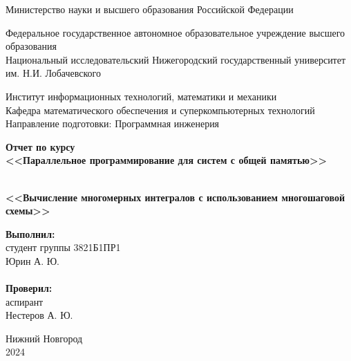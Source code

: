 \documentclass{report}
\begin{document}
\begin{titlepage}

\begin{center}
Министерство науки и высшего образования Российской Федерации
\end{center}

\begin{center}
Федеральное государственное автономное образовательное учреждение высшего образования \\
Национальный исследовательский Нижегородский государственный университет \newline им. Н.И. Лобачевского
\end{center}

\begin{center}
Институт информационных технологий, математики и механики \\
Кафедра математического обеспечения и суперкомпьютерных технологий \\
Направление подготовки: Программная инженерия
\end{center}

\begin{center}
\textbf{Отчет по курсу \\
\vspace{0.5em}
<<Параллельное программирование для систем с общей памятью>>} \\
\end{center}

\vspace{4em}

\begin{center}
\textbf{ \\
\vspace{0.5em}
<<Вычисление многомерных интегралов с использованием многошаговой схемы>>} \\
\end{center}

\vspace{4em}

\newbox{\lbox}
\newlength{\maxl}
\setlength{\maxl}{\wd\lbox}
\hfill\parbox{7cm}{
\hspace*{5cm}\hspace*{-5cm}\textbf{Выполнил:} \\ студент группы 3821Б1ПР1\\Юрин А. Ю.\\
\\
\hspace*{5cm}\hspace*{-5cm}\textbf{Проверил:}\\ аспирант\\Нестеров А. Ю.\\
}
\vspace{\fill}

\begin{center} Нижний Новгород \\ 2024 \end{center}

\end{titlepage}
\end{document}

